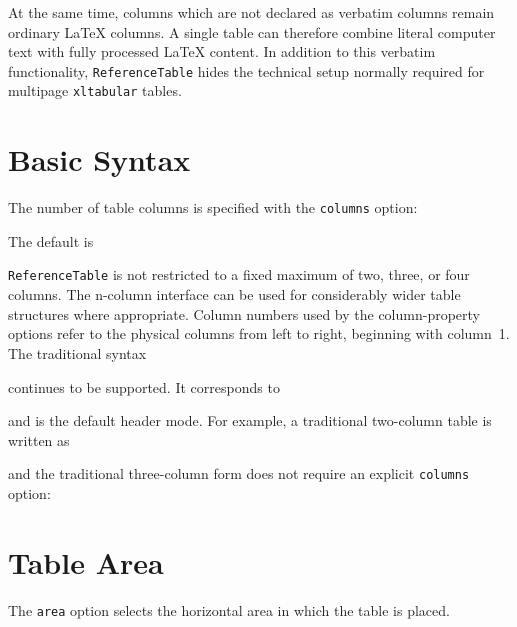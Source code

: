 \documentclass[
11pt,
a4paper,
oneside
]{scrbook}
\begin{document}
At the same time, columns which are not declared as verbatim columns remain
ordinary \LaTeX{} columns. A single table can therefore combine literal
computer text with fully processed \LaTeX{} content.
In addition to this verbatim functionality, \texttt{ReferenceTable} hides the
technical setup normally required for multipage \texttt{xltabular} tables.

\section{Basic Syntax}

The number of table columns is specified with the \texttt{columns} option:




The default is




\texttt{ReferenceTable} is not restricted to a fixed maximum of two, three,
or four columns. The n-column interface can be used for considerably wider
table structures where appropriate.
Column numbers used by the column-property options refer to the physical
columns from left to right, beginning with column~1.
The traditional syntax




continues to be supported. It corresponds to




and is the default header mode.
For example, a traditional two-column table is written as




and the traditional three-column form does not require an explicit
\texttt{columns} option:





\section{Table Area}

The \texttt{area} option selects the horizontal area in which the table is
placed.
\end{document}
